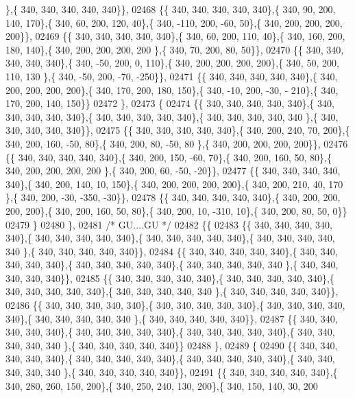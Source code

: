 \begin{DoxyCode}
      \},\{ 340, 340, 340, 340, 340\}\},
02468 \{\{ 340, 340, 340, 340, 340\},\{ 340,  90, 200, 140, 170\},\{ 340,  60, 200, 120,  40\},\{ 340, -110, 200, -60,  
      50\},\{ 340, 200, 200, 200, 200\}\},
02469 \{\{ 340, 340, 340, 340, 340\},\{ 340,  60, 200, 110,  40\},\{ 340, 160, 200, 180, 140\},\{ 340, 200, 200, 200, 200
      \},\{ 340,  70, 200,  80,  50\}\},
02470 \{\{ 340, 340, 340, 340, 340\},\{ 340, -50, 200,   0, 110\},\{ 340, 200, 200, 200, 200\},\{ 340,  50, 200, 110, 130
      \},\{ 340, -50, 200, -70, -250\}\},
02471 \{\{ 340, 340, 340, 340, 340\},\{ 340, 200, 200, 200, 200\},\{ 340, 170, 200, 180, 150\},\{ 340, -10, 200, -30, -
      210\},\{ 340, 170, 200, 140, 150\}\}
02472 \},
02473 \{
02474 \{\{ 340, 340, 340, 340, 340\},\{ 340, 340, 340, 340, 340\},\{ 340, 340, 340, 340, 340\},\{ 340, 340, 340, 340, 340
      \},\{ 340, 340, 340, 340, 340\}\},
02475 \{\{ 340, 340, 340, 340, 340\},\{ 340, 200, 240,  70, 200\},\{ 340, 200, 160, -50,  80\},\{ 340, 200,  80, -50,  80
      \},\{ 340, 200, 200, 200, 200\}\},
02476 \{\{ 340, 340, 340, 340, 340\},\{ 340, 200, 150, -60,  70\},\{ 340, 200, 160,  50,  80\},\{ 340, 200, 200, 200, 200
      \},\{ 340, 200,  60, -50, -20\}\},
02477 \{\{ 340, 340, 340, 340, 340\},\{ 340, 200, 140,  10, 150\},\{ 340, 200, 200, 200, 200\},\{ 340, 200, 210,  40, 170
      \},\{ 340, 200, -30, -350, -30\}\},
02478 \{\{ 340, 340, 340, 340, 340\},\{ 340, 200, 200, 200, 200\},\{ 340, 200, 160,  50,  80\},\{ 340, 200,  10, -310,  
      10\},\{ 340, 200,  80,  50,   0\}\}
02479 \}
02480 \},
02481 \textcolor{comment}{/* GU....GU */}
02482 \{\{
02483 \{\{ 340, 340, 340, 340, 340\},\{ 340, 340, 340, 340, 340\},\{ 340, 340, 340, 340, 340\},\{ 340, 340, 340, 340, 340
      \},\{ 340, 340, 340, 340, 340\}\},
02484 \{\{ 340, 340, 340, 340, 340\},\{ 340, 340, 340, 340, 340\},\{ 340, 340, 340, 340, 340\},\{ 340, 340, 340, 340, 340
      \},\{ 340, 340, 340, 340, 340\}\},
02485 \{\{ 340, 340, 340, 340, 340\},\{ 340, 340, 340, 340, 340\},\{ 340, 340, 340, 340, 340\},\{ 340, 340, 340, 340, 340
      \},\{ 340, 340, 340, 340, 340\}\},
02486 \{\{ 340, 340, 340, 340, 340\},\{ 340, 340, 340, 340, 340\},\{ 340, 340, 340, 340, 340\},\{ 340, 340, 340, 340, 340
      \},\{ 340, 340, 340, 340, 340\}\},
02487 \{\{ 340, 340, 340, 340, 340\},\{ 340, 340, 340, 340, 340\},\{ 340, 340, 340, 340, 340\},\{ 340, 340, 340, 340, 340
      \},\{ 340, 340, 340, 340, 340\}\}
02488 \},
02489 \{
02490 \{\{ 340, 340, 340, 340, 340\},\{ 340, 340, 340, 340, 340\},\{ 340, 340, 340, 340, 340\},\{ 340, 340, 340, 340, 340
      \},\{ 340, 340, 340, 340, 340\}\},
02491 \{\{ 340, 340, 340, 340, 340\},\{ 340, 280, 260, 150, 200\},\{ 340, 250, 240, 130, 200\},\{ 340, 150, 140,  30, 200

\end{DoxyCode}

